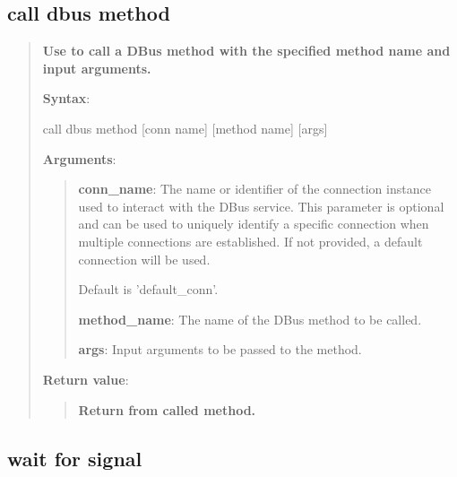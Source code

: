 \hypertarget{description-call-dbus-method}{%
\subsection{\texorpdfstring{\textbf{call dbus method}}{call dbus method}}\label{description-call-dbus-method}}

\begin{quote}
\textbf{Use to call a DBus method with the specified method name and input arguments.}

\textbf{Syntax}:
\begin{robotcode}
call dbus method 	[conn name] 	[method name] 	[args]
\end{robotcode}

\textbf{Arguments}:

\begin{quote}
\textbf{conn\_name}: The name or identifier of the connection instance used to interact with the DBus service.
  This parameter is optional and can be used to uniquely identify a specific connection
  when multiple connections are established. If not provided, a default connection will be used.

  Default is 'default\_conn'.

\vspace{\baselineskip}

\textbf{method\_name}: The name of the DBus method to be called.

\vspace{\baselineskip}

\textbf{args}: Input arguments to be passed to the method.
\end{quote}

\textbf{Return value}:

\begin{quote}
\textbf{Return from called method.}
\end{quote}
\end{quote}


\hypertarget{description-wait-for-signal}{%
\subsection{\texorpdfstring{\textbf{wait for signal}}{wait for signal}}\label{description-wait-for-signal}}

